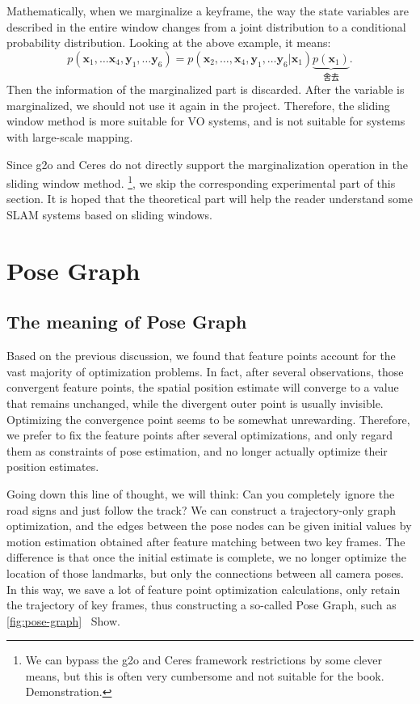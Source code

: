 Mathematically, when we marginalize a keyframe, the way the state variables are described in the entire window changes from a joint distribution to a conditional probability distribution. Looking at the above example, it means:
\begin{equation}
p\left( {{\bm{x}_1}, \ldots {\bm{x}_4},{\bm{y}_1}, \ldots {\bm{y}_6}} \right) = p\left( {{\bm{x}_2}, \ldots ,{\bm{x}_4},{\bm{y}_1}, \ldots {\bm{y}_6}|{\bm{x}_1}} \right)\underbrace {p\left( {{\bm{x}_1}} \right)}_{\text{舍去}}.
\end{equation}
Then the information of the marginalized part is discarded. After the variable is marginalized, we should not use it again in the project. Therefore, the sliding window method is more suitable for VO systems, and is not suitable for systems with large-scale mapping.

Since g2o and Ceres do not directly support the marginalization operation in the sliding window method. \footnote{We can bypass the g2o and Ceres framework restrictions by some clever means, but this is often very cumbersome and not suitable for the book. Demonstration. }, we skip the corresponding experimental part of this section. It is hoped that the theoretical part will help the reader understand some SLAM systems based on sliding windows.

\section{Pose Graph}
\subsection{The meaning of Pose Graph}
Based on the previous discussion, we found that feature points account for the vast majority of optimization problems. In fact, after several observations, those convergent feature points, the spatial position estimate will converge to a value that remains unchanged, while the divergent outer point is usually invisible. Optimizing the convergence point seems to be somewhat unrewarding. Therefore, we prefer to fix the feature points after several optimizations, and only regard them as constraints of pose estimation, and no longer actually optimize their position estimates.

Going down this line of thought, we will think: Can you completely ignore the road signs and just follow the track? We can construct a trajectory-only graph optimization, and the edges between the pose nodes can be given initial values ​​by motion estimation obtained after feature matching between two key frames. The difference is that once the initial estimate is complete, we no longer optimize the location of those landmarks, but only the connections between all camera poses. In this way, we save a lot of feature point optimization calculations, only retain the trajectory of key frames, thus constructing a so-called Pose Graph, such as \autoref{fig:pose-graph}~ Show.

